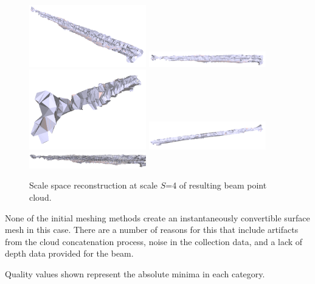 \documentclass[12pt]{drexelthesis}
\begin{document}
\begin{figure}[!ht]
	\centering
		\includegraphics[width=2in]{real-lab-scans/meshed/scalespace400.png}
		\includegraphics[width=2in]{real-lab-scans/meshed/scalespace401.png}
		\includegraphics[width=2in]{real-lab-scans/meshed/scalespace402.png}
		\includegraphics[width=2in]{real-lab-scans/meshed/scalespace403.png}
		\includegraphics[width=2in]{real-lab-scans/meshed/scalespace404.png}
		\caption[Scale space reconstruction at scale $S$=4 of segmented LiDAR data]{\centering Scale space reconstruction at scale $S$=4 of resulting beam point cloud.}
	\label{lidar:scalespace4}
\end{figure}

None of the initial meshing methods create an instantaneously convertible surface mesh in this case. There are a number of reasons for this that include artifacts from the cloud concatenation process, noise in the collection data, and a lack of depth data provided for the beam.

\begin{table}[!ht]
	\centering
		\caption[HDL-32E LiDAR scan initial mesh quality]{Quality analysis of initial meshing methods.}
	Quality values shown represent the absolute minima in each category.
	\label{table:realInit}
\end{table}
\end{document}

